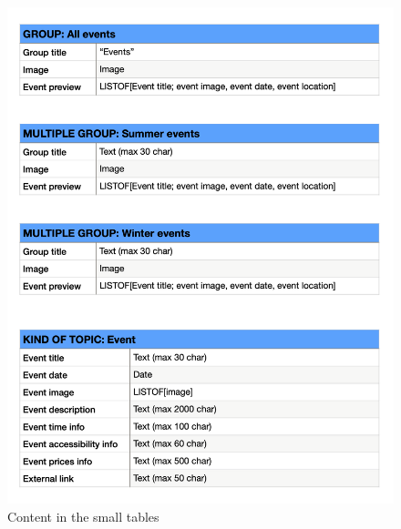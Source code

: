 \documentclass[table, 12pt]{article}
\begin{document}
\begin{figure}[H]
    \begin{center}
        \includegraphics[width=\textwidth]{assets/Tables/Small/contentSmall3.png}
        \caption{Content in the small tables}
    \end{center}
\end{figure}
\end{document}

